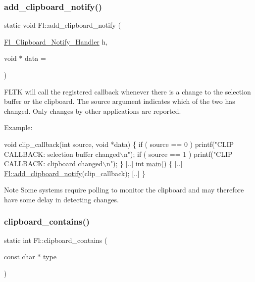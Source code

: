 \subsubsection{\texorpdfstring{add\+\_\+clipboard\+\_\+notify()}{add\_clipboard\_notify()}}
{\footnotesize\ttfamily static void Fl\+::add\+\_\+clipboard\+\_\+notify (\begin{DoxyParamCaption}\item[{\hyperlink{group__callback__functions_gae5e26cbad23960ff7ce4d50d82c74750}{Fl\+\_\+\+Clipboard\+\_\+\+Notify\+\_\+\+Handler}}]{h,  }\item[{void $\ast$}]{data = {} }\end{DoxyParamCaption})\hspace{0.3cm}{\ttfamily [static]}}

F\+L\+TK will call the registered callback whenever there is a change to the selection buffer or the clipboard. The source argument indicates which of the two has changed. Only changes by other applications are reported.

Example\+: 
\begin{DoxyCode}
\textcolor{keywordtype}{void} clip\_callback(\textcolor{keywordtype}{int} source, \textcolor{keywordtype}{void} *data) \{
    \textcolor{keywordflow}{if} ( source == 0 ) printf(\textcolor{stringliteral}{"CLIP CALLBACK: selection buffer changed\(\backslash\)n"});
\textcolor{keywordflow}{if} ( source == 1 ) printf(\textcolor{stringliteral}{"CLIP CALLBACK: clipboard changed\(\backslash\)n"});
\}
[..]
\textcolor{keywordtype}{int} \hyperlink{main_8cpp_ae66f6b31b5ad750f1fe042a706a4e3d4}{main}() \{
    [..]
\hyperlink{group__fl__clipboard_gacb12c3b9a4f45f9ba9b7d8689c42d07c}{Fl::add\_clipboard\_notify}(clip\_callback);
[..]
\}
\end{DoxyCode}
 \begin{DoxyNote}{Note}
Some systems require polling to monitor the clipboard and may therefore have some delay in detecting changes. 
\end{DoxyNote}
\mbox{\label{group__fl__clipboard_gae3e2af75e25fd4aa06aa41744cc4e493}} 
\subsubsection{\texorpdfstring{clipboard\+\_\+contains()}{clipboard\_contains()}}
{\footnotesize\ttfamily static int Fl\+::clipboard\+\_\+contains (\begin{DoxyParamCaption}\item[{const char $\ast$}]{type }\end{DoxyParamCaption})\hspace{0.3cm}{\ttfamily [static]}}


